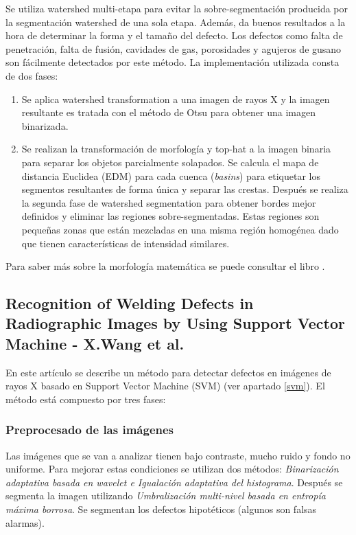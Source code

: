 Se utiliza watershed multi-etapa para evitar la sobre-segmentación producida por la segmentación watershed de una sola etapa. Además, da buenos resultados a la hora de determinar la forma y el tamaño del defecto. Los defectos como falta de penetración, falta de fusión, cavidades de gas, porosidades y agujeros de gusano son fácilmente detectados por este método.
La implementación utilizada consta de dos fases:
\begin{enumerate}
\item Se aplica watershed transformation a una imagen de rayos X y la imagen resultante es tratada con el método de Otsu para obtener una imagen binarizada.
\item Se realizan la transformación de morfología y top-hat a la imagen binaria para separar los objetos parcialmente solapados. Se calcula el mapa de distancia Euclidea (EDM) para cada cuenca (\emph{basins}) para etiquetar los segmentos resultantes de forma única y separar las crestas. Después se realiza la segunda fase de watershed segmentation para obtener bordes mejor definidos y eliminar las regiones sobre-segmentadas. Estas regiones son pequeñas zonas que están mezcladas en una misma región homogénea dado que tienen características de intensidad similares.
\end{enumerate}
Para saber más sobre la morfología matemática se puede consultar el libro \cite{gonzalez2008digital}.

\subsection{Recognition of Welding Defects in Radiographic Images by Using Support Vector Machine - X.Wang et al.}
En este artículo \cite{wang2010recognition} se describe un método para detectar defectos en imágenes de rayos X basado en Support Vector Machine (SVM) (ver apartado \ref{svm}).
El método está compuesto por tres fases:


\subsubsection{Preprocesado de las imágenes}
 Las imágenes que se van a analizar tienen bajo contraste, mucho ruido y fondo no uniforme. Para mejorar estas condiciones se utilizan dos métodos: \textit{Binarización adaptativa basada en wavelet e Igualación adaptativa del histograma}. 
Después se segmenta la imagen utilizando \textit{Umbralización multi-nivel basada en entropía máxima borrosa}.
Se segmentan los defectos hipotéticos (algunos son falsas alarmas).


